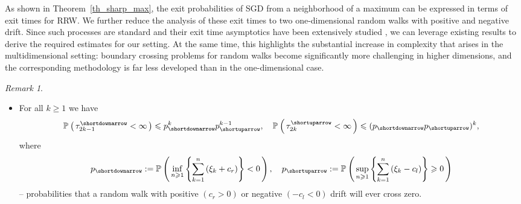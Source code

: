 \documentclass{article}
\makeatletter
\theoremstyle{plain}
\theoremstyle{definition}
\theoremstyle{remark}
\newtheorem{remark}[theorem]{Remark}
\newcommand{\p}[2][]{{\mathbb{P}}_{#1} \left( \, #2 \, \right) } %
\newcommand{\skk}[1]{\left\{ #1 \right\}} %
\def\namedlabel#1#2{\begingroup
    #2%
    \def\@currentlabel{#2}%
    \phantomsection\label{#1}\endgroup
}
\makeatother
\begin{document}
As shown in Theorem~\ref{th_sharp_max}, the exit probabilities of SGD from a neighborhood of a maximum can be expressed in terms of exit times for RRW. We further reduce the analysis of these exit times to two  one-dimensional random walks with positive and negative drift. Since such processes are standard and their exit time asymptotics have been extensively studied \citep{Borovkov:20013, gut2008, siegmund1985}, we can leverage existing results to derive the required estimates for our setting. At the same time, this highlights the substantial increase in complexity that arises in the multidimensional setting: boundary crossing problems for random walks become significantly more challenging in higher dimensions, and the corresponding methodology is far less developed than in the one-dimensional case.

\begin{remark}\label{rk_sharp_max}
\begin{itemize}
\item[\namedlabel{rk_sm_i}{$(i)$}] For all $k\geqslant 1$ we have
\begin{equation}\label{eq_sharp_max_1}
\begin{split}
   \p{ \tau_{2 k-1}^{\shortdownarrow} < \infty} \leqslant p_{\shortdownarrow}^k p_{\shortuparrow}^{k-1}, \quad \p{ \tau_{2 k}^{\shortuparrow} < \infty} \leqslant (p_{\shortdownarrow} p_{\shortuparrow})^k,  
\end{split}
\end{equation}
where
\[
    \begin{split}
    p_{\shortdownarrow}:= \p{\inf\limits_{n \geqslant 1} \skk{\sum\limits_{k=1}^n \left(\xi_k +c_r\right)} < 0}, \quad p_{\shortuparrow}:=\p{\sup\limits_{n\geqslant 1} \skk{\sum\limits_{k=1}^n \left(\xi_k -c_l\right)} \geqslant 0}
    \end{split}
\]
--  probabilities that a random walk with positive $(c_r >0)$ or negative $(-c_l < 0)$ drift will ever cross zero. 


\end{itemize}
\end{remark}
\end{document}

